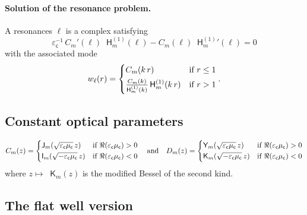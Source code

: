 \documentclass[12pt,a4paper]{article}
\newcommand{\bJ}{\mathop{}\!\mathsf{J}}
\newcommand{\bY}{\mathop{}\!\mathsf{Y}}
\newcommand{\Hu}{\mathop{}\!\mathsf{H}^{(1)}}
\newcommand{\bI}{\mathop{}\!\mathsf{I}}
\newcommand{\bK}{\mathop{}\!\mathsf{K}}
\newcommand{\ecav}{\varepsilon_\mathsf{c}}
\newcommand{\mcav}{\mu_\mathsf{c}}
\begin{document}
\paragraph{Solution of the resonance problem.}
A resonances $\ell$ is a complex satisfying
\begin{equation}
    \ecav^{-1}\, C_m'(\ell) \Hu_m(\ell) - C_m(\ell) {\Hu_m}'(\ell) = 0
\end{equation}
with the associated mode
\begin{equation}
    w_\ell(r) = \begin{dcases}
        C_m(k\, r) & \text{if } r \le 1\\
        \tfrac{C_m(k)}{\Hu_m(k)}\Hu_m(k\, r) & \text{if } r > 1
    \end{dcases}.
\end{equation}

\subsection{Constant optical parameters}

\[
    C_m(z) = \begin{dcases}
        \bJ_m(\sqrt{\ecav\mcav}\, z) & \text{if } \Re(\ecav\mcav) > 0\\
        \bI_m(\sqrt{-\ecav\mcav}\, z) & \text{if } \Re(\ecav\mcav) < 0
    \end{dcases} \quad
    \text{and} \quad
    D_m(z) = \begin{dcases}
        \bY_m(\sqrt{\ecav\mcav}\, z) & \text{if } \Re(\ecav\mcav) > 0\\
        \bK_m(\sqrt{-\ecav\mcav}\, z) & \text{if } \Re(\ecav\mcav) < 0
    \end{dcases}
\]
where $z \mapsto \bK_m(z)$ is the modified Bessel of the second kind.

\subsection{The flat well version}
\end{document}
